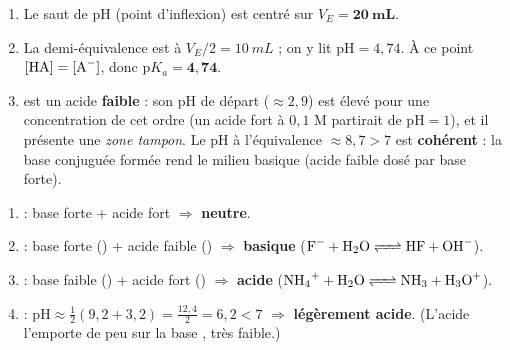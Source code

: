 \documentclass[11pt,a4paper]{article}
\begin{document}
\begin{corrige}
\begin{enumerate}[label=\alph*)]
  \item Le saut de pH (point d'inflexion) est centré sur $V_E = \mathbf{20\ mL}$.
  \item La demi-équivalence est à $V_E/2 = \qty{10}{mL}$ ; on y lit $\mathrm{pH} = 4{,}74$. À ce point
        $[\ce{HA}] = [\ce{A-}]$, donc $\mathrm{p}K_a = \mathbf{4{,}74}$.
  \item {} est un acide \textbf{faible} : son pH de départ ($\approx 2{,}9$) est élevé pour une
        concentration de cet ordre (un acide fort à $0{,}1$ M partirait de $\mathrm{pH} = 1$), et il présente une
        \emph{zone tampon}. Le pH à l'équivalence $\approx 8{,}7 > 7$ est \textbf{cohérent} : la base conjuguée
         formée rend le milieu basique (acide faible dosé par base forte).
\end{enumerate}
\end{corrige}

\begin{corrige}
\begin{enumerate}[label=\alph*)]
  \item {} : base forte + acide fort $\Rightarrow$ \textbf{neutre}.
  \item {} : base forte () + acide faible () $\Rightarrow$ \textbf{basique}
        ($\ce{F- + H2O <=> HF + OH-}$).
  \item {} : base faible () + acide fort () $\Rightarrow$ \textbf{acide}
        ($\ce{NH4+ + H2O <=> NH3 + H3O+}$).
  \item {} : $\mathrm{pH} \approx \tfrac12(9{,}2 + 3{,}2) = \tfrac{12{,}4}{2} = 6{,}2 < 7$ $\Rightarrow$
        \textbf{légèrement acide}. (L'acide  l'emporte de peu sur la base , très faible.)
\end{enumerate}
\end{corrige}
\end{document}
